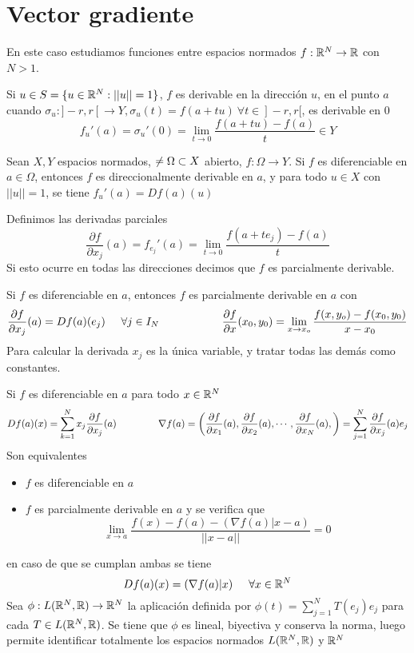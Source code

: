 \section{Vector gradiente}
En este caso estudiamos funciones entre espacios normados $f:\mathbb{R}^N\rightarrow\mathbb{R}$ con $N>1$.

Si $u\in S=\{ u\in\mathbb{R}^N : ||u||=1 \}$, $f$ es derivable en la dirección $u$, en el punto $a$ cuando $\sigma_u:]-r,r[\rightarrow Y, \sigma_u(t)=f(a+tu)\ \forall t\in]-r,r[$, es derivable en $0$
$$ f_u'(a) = \sigma_u'(0) = \lim_{t\rightarrow 0} \frac{f(a+tu)-f(a)}{t}\in Y $$

Sean $X,Y$ espacios normados, $\empty\not=\Omega\subset X$ abierto, $f:\Omega\rightarrow Y$. Si $f$ es diferenciable en $a\in\Omega$, entonces $f$ es direccionalmente derivable en $a$, y para todo $u\in X$ con $||u||=1$, se tiene $f_u'(a) = Df(a) (u)$

Definimos las derivadas parciales
$$ \frac{\partial f}{\partial x_j} (a) = f_{e_j}'(a) = \lim_{t\rightarrow 0} \frac{f(a+te_j)-f(a)}{t} $$
Si esto ocurre en todas las direcciones decimos que $f$ es parcialmente derivable.

Si $f$ es diferenciable en $a$, entonces $f$ es parcialmente derivable en $a$ con
$$ \frac{\partial f}{\partial x_j} (a) = Df(a)(e_j) \hspace{0.5cm}\forall j\in I_N\hspace{2cm}
\frac{\partial f}{\partial x} (x_0,y_0) = \lim_{x\rightarrow x_o} \frac{f(x,y_o)-f(x_0,y_0)}{x-x_0} $$
Para calcular la derivada $x_j$ es la única variable, y tratar todas las demás como constantes.

Si $f$ es diferenciable en $a$ para todo $x\in\mathbb{R}^N$
$$ Df(a)(x) = \sum_{k=1}^{N} x_j\frac{\partial f}{\partial x_j} (a)\hspace{1.5cm}
\nabla f(a) = \left( \frac{\partial f}{\partial x_1}(a), \frac{\partial f}{\partial x_2}(a),\cdots,\frac{\partial f}{\partial x_N}(a),   \right) = \sum_{j=1}^{N}\frac{\partial f}{\partial x_j} (a)e_j $$
Son equivalentes
\begin{itemize}
	\item $f$ es diferenciable en $a$
	\item $f$ es parcialmente derivable en $a$ y se verifica que
	$$ \lim_{x\rightarrow a} \frac{f(x)-f(a)-(\nabla f(a) | x-a)}{||x-a||} = 0$$
\end{itemize}
en caso de que se cumplan ambas se tiene
$$ Df(a)(x) = ( \nabla f(a) | x ) \hspace{0.5cm} \forall x\in\mathbb{R}^N$$
Sea $\phi : L(\mathbb{R}^N,\mathbb{R}) \rightarrow \mathbb{R}^N$ la aplicación definida por $\phi(t) = \sum_{j=1}^{N} T(e_j) e_j$ para cada $T\in L(\mathbb{R}^N,\mathbb{R})$. Se tiene que $\phi$ es lineal, biyectiva y conserva la norma, luego permite identificar totalmente los espacios normados $L(\mathbb{R}^N,\mathbb{R})$ y $\mathbb{R}^N$

